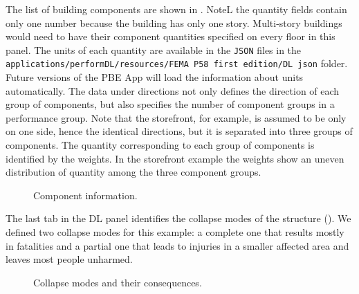 The list of building components are shown in . NoteL the quantity fields contain only one number because the building has only one story. Multi-story buildings would need to have their component quantities specified on every floor in this panel. The units of each quantity are available in the \texttt{JSON} files in the \texttt{applications/performDL/resources/FEMA P58 first edition/DL json} folder. Future versions of the PBE App will load the information about units automatically. The data under directions not only defines the direction of each group of components, but also specifies the number of component groups in a performance group. Note that the storefront, for example, is assumed to be only on one side, hence the identical directions, but it is separated into three groups of components. The quantity corresponding to each group of components is identified by the weights. In the storefront example the weights show an uneven distribution of quantity among the three component groups.\\

\begin{figure}[!htbp]
  \caption{Component information.}
  \label{fig:ex_1_DL_2}
\end{figure}

The last tab in the DL panel identifies the collapse modes of the structure (). We defined two collapse modes for this example: a complete one that results mostly in fatalities and a partial one that leads to injuries in a smaller affected area and leaves most people unharmed.\\

\begin{figure}[!htbp]
  \caption{Collapse modes and their consequences.}
  \label{fig:ex_1_DL_3}
\end{figure}

